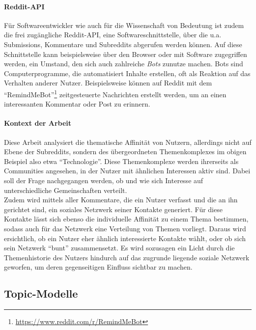 \documentclass[11pt,a4paper,twoside]{article}
\let\rmarkdownfootnote\footnote%
\def\footnote{\protect\rmarkdownfootnote}
\let\oldpar\paragraph
\renewcommand{\paragraph}{\oldpar*}
\begin{document}
\hypertarget{reddit-api}{%
\paragraph{Reddit-API}\label{reddit-api}}

Für Softwareentwickler wie auch für die Wissenschaft von Bedeutung ist
zudem die frei zugängliche Reddit-API, eine Softwareschnittstelle, über
die u.a. Submissions, Kommentare und Subreddits abgerufen werden können.
Auf diese Schnittstelle kann beispielsweise über den Browser oder mit
Software zugegriffen werden, ein Umstand, den sich auch zahlreiche
\emph{Bots} zunutze machen. Bots sind Computerprogramme, die
automatisiert Inhalte erstellen, oft als Reaktion auf das Verhalten
anderer Nutzer. Beispielsweise können auf Reddit mit dem
\enquote{RemindMeBot}\footnote{\url{https://www.reddit.com/r/RemindMeBot}}
zeitgesteuerte Nachrichten erstellt werden, um an einen interessanten
Kommentar oder Post zu erinnern.

\hypertarget{kontext-der-arbeit}{%
\paragraph{Kontext der Arbeit}\label{kontext-der-arbeit}}

Diese Arbeit analysiert die thematische Affinität von Nutzern,
allerdings nicht auf Ebene der Subreddits, sondern des übergeordneten
Themenkomplexes im obigen Beispiel also etwa \enquote{Technologie}.
Diese Themenkomplexe werden ihrerseits als Communities angesehen, in der
Nutzer mit ähnlichen Interessen aktiv sind. Dabei soll der Frage
nachgegangen werden, ob und wie sich Interesse auf unterschiedliche
Gemeinschaften verteilt.\\
Zudem wird mittels aller Kommentare, die ein Nutzer verfasst und die an
ihn gerichtet sind, ein soziales Netzwerk seiner Kontakte generiert. Für
diese Kontakte lässt sich ebenso die individuelle Affinität zu einem
Thema bestimmen, sodass auch für das Netzwerk eine Verteilung von Themen
vorliegt. Daraus wird ersichtlich, ob ein Nutzer eher ähnlich
interessierte Kontakte wählt, oder ob sich sein Netzwerk \enquote{bunt}
zusammensetzt. Es wird sozusagen ein Licht durch die Themenhistorie des
Nutzers hindurch auf das zugrunde liegende soziale Netzwerk geworfen, um
deren gegenseitigen Einfluss sichtbar zu machen.

\hypertarget{topicmodelle}{%
\subsection{Topic-Modelle}\label{topicmodelle}}
\end{document}
